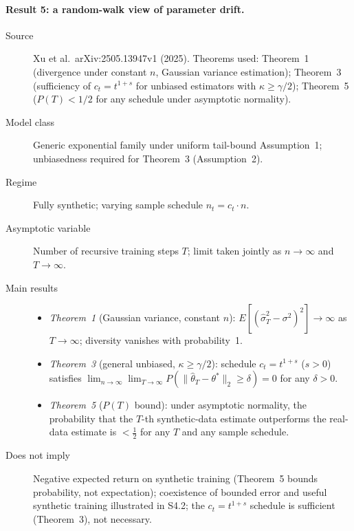 \paragraph{Result 5: a random-walk view of parameter drift.}
\begin{description}
\item[Source] Xu et al.\ arXiv:2505.13947v1 (2025).
  Theorems used: Theorem~1 (divergence under constant $n$, Gaussian variance
  estimation); Theorem~3 (sufficiency of $c_t = t^{1+s}$ for unbiased estimators
  with $\kappa \ge \gamma/2$); Theorem~5 ($P(T) < 1/2$ for any schedule under
  asymptotic normality).
\item[Model class] Generic exponential family under uniform tail-bound
  Assumption~1; unbiasedness required for Theorem~3 (Assumption~2).
\item[Regime] Fully synthetic; varying sample schedule $n_t = c_t \cdot n$.
\item[Asymptotic variable] Number of recursive training steps $T$; limit taken
  jointly as $n \to \infty$ and $T \to \infty$.
\item[Main results]
  \begin{itemize}
  \item \emph{Theorem~1} (Gaussian variance, constant $n$):
    $E[(\hat\sigma^2_T - \sigma^2)^2] \to \infty$ as $T \to \infty$; diversity
    vanishes with probability~1.
  \item \emph{Theorem~3} (general unbiased, $\kappa \ge \gamma/2$):
    schedule $c_t = t^{1+s}$ ($s > 0$) satisfies
    $\lim_{n\to\infty}\lim_{T\to\infty} P(\|\hat\theta_T - \theta^*\|_2 \ge \delta)
    = 0$ for any $\delta > 0$.
  \item \emph{Theorem~5} ($P(T)$ bound): under asymptotic normality, the probability
    that the $T$-th synthetic-data estimate outperforms the real-data estimate is
    $< \tfrac{1}{2}$ for any $T$ and any sample schedule.
  \end{itemize}
\item[Does not imply] Negative expected return on synthetic training (Theorem~5
  bounds probability, not expectation); coexistence of bounded error and useful
  synthetic training illustrated in S4.2; the $c_t = t^{1+s}$ schedule is
  sufficient (Theorem~3), not necessary.
\end{description}

